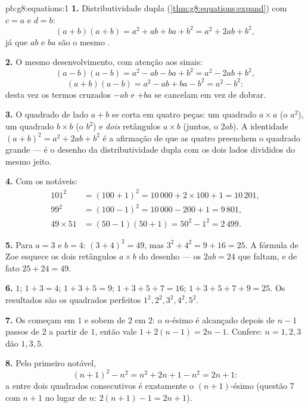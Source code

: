 \begin{solution}{pb:g8:equations:1}
\textbf{1.} Distributividade dupla (\cref{thm:g8:equations:expand})
com $c = a$ e $d = b$:
\[
(a + b)(a + b) = a^2 + ab + ba + b^2 = a^2 + 2ab + b^2 ,
\]
já que $ab$ e $ba$ são o mesmo .

\textbf{2.} O mesmo desenvolvimento, com atenção aos sinais:
\[
(a - b)(a - b) = a^2 - ab - ba + b^2 = a^2 - 2ab + b^2 ,
\]
\[
(a + b)(a - b) = a^2 - ab + ba - b^2 = a^2 - b^2 :
\]
desta vez os termos cruzados $-ab$ e $+ba$ se cancelam em vez de
dobrar.

\textbf{3.} O quadrado de lado $a + b$ se corta em quatro peças: um
quadrado $a \times a$ (o $a^2$), um quadrado $b \times b$ (o $b^2$) e
\emph{dois} retângulos $a \times b$ (juntos, o $2ab$). A identidade
$(a+b)^2 = a^2 + 2ab + b^2$ é a afirmação de que as quatro 
preenchem o quadrado grande --- é o desenho da distributividade dupla
com os dois lados divididos do mesmo jeito.

\textbf{4.} Com os  notáveis:
\begin{align*}
101^2 &= (100 + 1)^2 = 10\,000 + 2 \times 100 + 1 = 10\,201, \\
99^2 &= (100 - 1)^2 = 10\,000 - 200 + 1 = 9\,801, \\
49 \times 51 &= (50 - 1)(50 + 1) = 50^2 - 1^2 = 2\,499 .
\end{align*}

\textbf{5.} Para $a = 3$ e $b = 4$: $(3 + 4)^2 = 49$, mas
$3^2 + 4^2 = 9 + 16 = 25$. A fórmula de Zoe esquece os dois retângulos
$a \times b$ do desenho --- os $2ab = 24$ que faltam, e de fato
$25 + 24 = 49$.

\textbf{6.} $1$; $1 + 3 = 4$; $1 + 3 + 5 = 9$; $1 + 3 + 5 + 7 = 16$;
$1 + 3 + 5 + 7 + 9 = 25$. Os resultados são os quadrados perfeitos
$1^2, 2^2, 3^2, 4^2, 5^2$.

\textbf{7.} Os  começam em $1$ e sobem de $2$ em $2$: o
$n$-ésimo é alcançado depois de $n - 1$ passos de $2$ a partir de $1$,
então vale $1 + 2(n - 1) = 2n - 1$. Confere: $n = 1, 2, 3$ dão
$1, 3, 5$.

\textbf{8.} Pelo primeiro  notável,
\[
(n + 1)^2 - n^2 = n^2 + 2n + 1 - n^2 = 2n + 1 :
\]
a  entre dois quadrados consecutivos é exatamente o
$(n+1)$-ésimo  (questão 7 com $n + 1$ no lugar de $n$:
$2(n+1) - 1 = 2n + 1$).


\end{solution}
